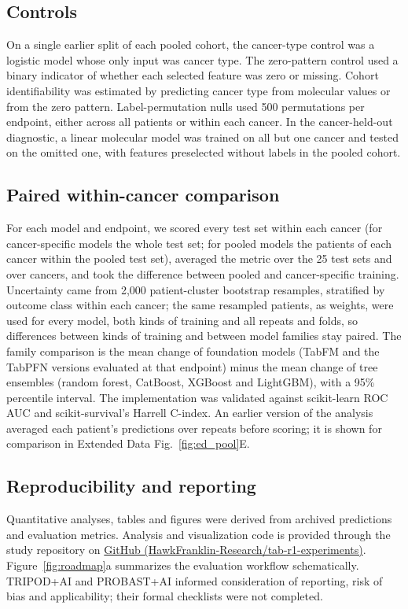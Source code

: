 \subsection*{Controls}
On a single earlier split of each pooled cohort, the cancer-type control was a logistic model whose only input was cancer type. The zero-pattern control used a binary indicator of whether each selected feature was zero or missing. Cohort identifiability was estimated by predicting cancer type from molecular values or from the zero pattern. Label-permutation nulls used 500 permutations per endpoint, either across all patients or within each cancer. In the cancer-held-out diagnostic, a linear molecular model was trained on all but one cancer and tested on the omitted one, with features preselected without labels in the pooled cohort.

\subsection*{Paired within-cancer comparison}
For each model and endpoint, we scored every test set within each cancer (for cancer-specific models the whole test set; for pooled models the patients of each cancer within the pooled test set), averaged the metric over the 25 test sets and over cancers, and took the difference between pooled and cancer-specific training. Uncertainty came from 2,000 patient-cluster bootstrap resamples, stratified by outcome class within each cancer; the same resampled patients, as weights, were used for every model, both kinds of training and all repeats and folds, so differences between kinds of training and between model families stay paired. The family comparison is the mean change of foundation models (TabFM and the TabPFN versions evaluated at that endpoint) minus the mean change of tree ensembles (random forest, CatBoost, XGBoost and LightGBM), with a 95\% percentile interval. The implementation was validated against scikit-learn ROC AUC and scikit-survival's Harrell C-index. An earlier version of the analysis averaged each patient's predictions over repeats before scoring; it is shown for comparison in Extended Data Fig.~\ref{fig:ed_pool}E.

\subsection*{Reproducibility and reporting}
Quantitative analyses, tables and figures were derived from archived predictions and evaluation metrics. Analysis and visualization code is provided through the study repository on \href{https://github.com/HawkFranklin-Research/tab-r1-experiments}{GitHub (HawkFranklin-Research/tab-r1-experiments)}. Figure~\ref{fig:roadmap}a summarizes the evaluation workflow schematically. TRIPOD+AI and PROBAST+AI informed consideration of reporting, risk of bias and applicability; their formal checklists were not completed.\citep{tripodai2024,probastai2024}

